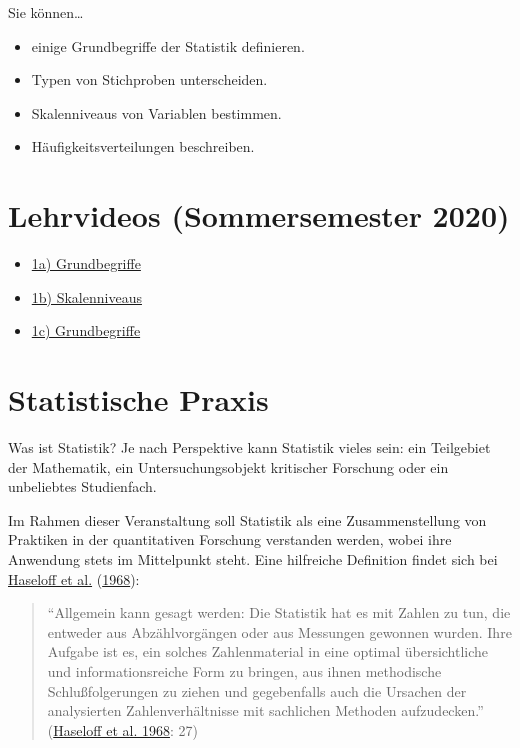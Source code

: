\documentclass[
  11pt,
  ngerman,
  a4paper,
]{report}
\providecommand{\tightlist}{%
  \setlength{\itemsep}{0pt}\setlength{\parskip}{0pt}}
\begin{document}
Sie können\ldots{}

\begin{itemize}
\tightlist
\item
  einige Grundbegriffe der Statistik definieren.
\item
  Typen von Stichproben unterscheiden.
\item
  Skalenniveaus von Variablen bestimmen.
\item
  Häufigkeitsverteilungen beschreiben.
\end{itemize}

\hypertarget{lehrvideos-sommersemester-2020}{%
\section*{Lehrvideos (Sommersemester 2020)}\label{lehrvideos-sommersemester-2020}}

\begin{itemize}
\tightlist
\item
  \href{https://video01.uni-frankfurt.de/Mediasite/Play/36dca452df154bd3b7be2e069174e8991d}{1a) Grundbegriffe}
\item
  \href{https://video01.uni-frankfurt.de/Mediasite/Play/5a397035f7a6468fa2cecf802ca8d52a1d}{1b) Skalenniveaus}
\item
  \href{https://video01.uni-frankfurt.de/Mediasite/Play/5fce0458009b4da283b14fdc30e3a0ea1d}{1c) Grundbegriffe}
\end{itemize}

\hypertarget{statistische-praxis}{%
\section{Statistische Praxis}\label{statistische-praxis}}

Was ist Statistik? Je nach Perspektive kann Statistik vieles sein: ein Teilgebiet der Mathematik, ein Untersuchungsobjekt kritischer Forschung oder ein unbeliebtes Studienfach.

Im Rahmen dieser Veranstaltung soll Statistik als eine Zusammenstellung von Praktiken in der quantitativen Forschung verstanden werden, wobei ihre Anwendung stets im Mittelpunkt steht. Eine hilfreiche Definition findet sich bei \protect\hyperlink{ref-haseloff}{Haseloff et al.} (\protect\hyperlink{ref-haseloff}{1968}):

\begin{quote}
\enquote{Allgemein kann gesagt werden: Die Statistik hat es mit Zahlen zu tun, die entweder aus Abzählvorgängen oder aus Messungen gewonnen wurden. Ihre Aufgabe ist es, ein solches Zahlenmaterial in eine optimal übersichtliche und informationsreiche Form zu bringen, aus ihnen methodische Schlußfolgerungen zu ziehen und gegebenfalls auch die Ursachen der analysierten Zahlenverhältnisse mit sachlichen Methoden aufzudecken.} (\protect\hyperlink{ref-haseloff}{Haseloff et al. 1968}: 27)
\end{quote}
\end{document}
